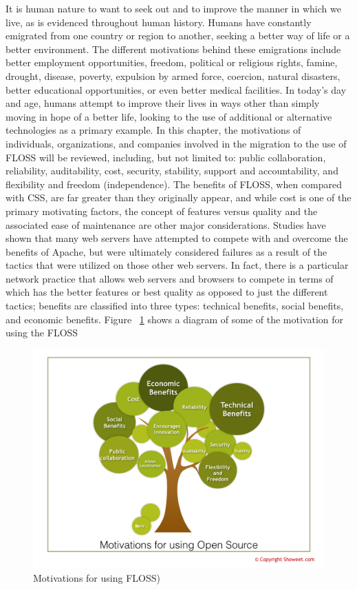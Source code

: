  It is human nature to want to seek out and to improve the manner in which we live, as is evidenced throughout human history. Humans have constantly emigrated from one country or region to another, seeking a better way of life or a better environment. The different motivations behind these emigrations include better employment opportunities, freedom, political or religious rights, famine, drought, disease, poverty, expulsion by armed force, coercion, natural disasters, better educational opportunities, or even better medical facilities.  In today’s day and age, humans attempt to improve their lives in ways other than simply moving in hope of a better life, looking to the use of additional or alternative technologies as a primary example.
 \newpage
 In this chapter, the motivations of individuals, organizations, and companies involved in the migration to the use of FLOSS will be reviewed, including, but not limited to: public collaboration, reliability, auditability, cost, security, stability, support and accountability, and flexibility and freedom (independence). The benefits of FLOSS, when compared with CSS, are far greater than they originally appear, and while cost is one of the primary motivating factors, the concept of features versus quality and the associated ease of maintenance are other major considerations. Studies have shown that many web servers have attempted to compete with and overcome the benefits of Apache, but were ultimately considered failures as a result of the tactics that were utilized on those other web servers. In fact, there is a particular network practice that allows web servers and browsers to compete in terms of which has the better features or best quality as opposed to just the different tactics; benefits are classified into three types: technical benefits, social benefits, and economic benefits.
 Figure ~\ref{fig:Motivations}  shows a diagram of some of the motivation for using the FLOSS 

  \begin{figure}
  \centering
      \includegraphics[scale=0.6,angle=90]{img/motivation.png}
    \caption{Motivations for using FLOSS)}
    \label{fig:Motivations}
  \end{figure}

